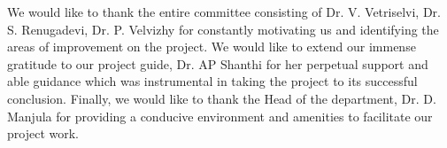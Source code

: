 We would like to thank the entire committee consisting of Dr. V. Vetriselvi, Dr. S. Renugadevi, Dr. P. Velvizhy for constantly motivating us and identifying the areas of improvement on the project. We would like to extend our immense gratitude to our project guide, Dr. AP Shanthi for her perpetual support and able guidance which was instrumental in taking the project to its successful conclusion. Finally, we would like to thank the Head of the department, Dr. D. Manjula for providing a conducive environment and amenities to facilitate our project work.